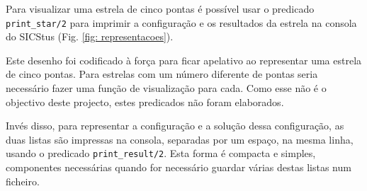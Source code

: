 
Para visualizar uma estrela de cinco pontas é possível usar o predicado \verb|print_star/2| para imprimir a configuração e os resultados da estrela na consola do SICStus (Fig. \ref{fig: representacoes}).

Este desenho foi codificado à força para ficar apelativo ao representar uma estrela de cinco pontas. Para estrelas com um número diferente de pontas seria necessário fazer uma função de visualização para cada. Como esse não é o objectivo deste projecto, estes predicados não foram elaborados. 

Invés disso, para representar a configuração e a solução dessa configuração, as duas listas são impressas na consola, separadas por um espaço, na mesma linha, usando o predicado \verb|print_result/2|. Esta forma é compacta e simples, componentes necessárias quando for necessário guardar várias destas listas num ficheiro.